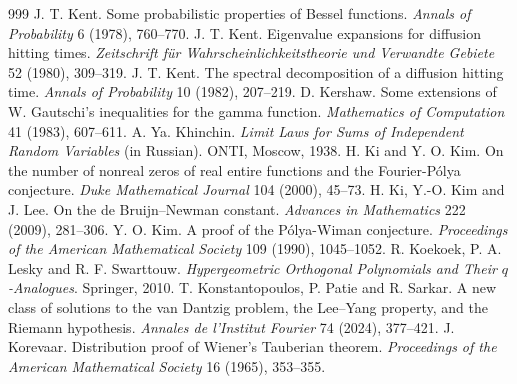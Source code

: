 \begin{thebibliography}{999}
 J. T. Kent. Some probabilistic properties of Bessel functions. \emph{Annals of Probability} 6 (1978), 760--770.
 J. T. Kent. Eigenvalue expansions for diffusion hitting times. \emph{Zeitschrift f\"ur Wahrscheinlichkeitstheorie und Verwandte Gebiete} 52 (1980), 309--319.
 J. T. Kent. The spectral decomposition of a diffusion hitting time. \emph{Annals of Probability} 10 (1982), 207--219.
 D. Kershaw. Some extensions of W. Gautschi's inequalities for the gamma function. \emph{Mathematics of Computation} 41 (1983), 607--611.
 A. Ya. Khinchin. \emph{Limit Laws for Sums of Independent Random Variables} (in Russian). ONTI, Moscow, 1938.
 H. Ki and Y. O. Kim. On the number of nonreal zeros of real entire functions and the Fourier-P\'olya conjecture. \emph{Duke Mathematical Journal} 104 (2000), 45--73.
 H. Ki, Y.-O. Kim and J. Lee. On the de Bruijn--Newman constant. \emph{Advances in Mathematics} 222 (2009), 281--306.
 Y. O. Kim. A proof of the P\'olya-Wiman conjecture. \emph{Proceedings of the American Mathematical Society} 109 (1990), 1045--1052.
 R. Koekoek, P. A. Lesky and R. F. Swarttouw. \emph{Hypergeometric Orthogonal Polynomials and Their $q$-Analogues}. Springer, 2010.
 T. Konstantopoulos, P. Patie and R. Sarkar. A new class of solutions to the van Dantzig problem, the Lee--Yang property, and the Riemann hypothesis. \emph{Annales de l'Institut Fourier} 74 (2024), 377--421.
 J. Korevaar. Distribution proof of Wiener's Tauberian theorem. \emph{Proceedings of the American Mathematical Society} 16 (1965), 353--355.

\end{thebibliography}
